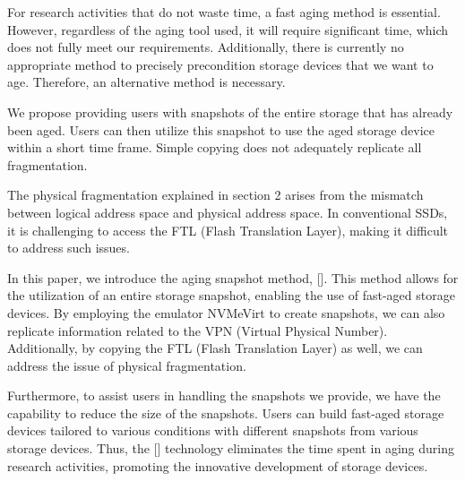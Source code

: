 For research activities that do not waste time, a fast aging method is essential.
However, regardless of the aging tool used, it will require significant time, which does not fully meet our requirements.
Additionally, there is currently no appropriate method to precisely precondition storage devices that we want to age.
Therefore, an alternative method is necessary.

We propose providing users with snapshots of the entire storage that has already been aged.
Users can then utilize this snapshot to use the aged storage device within a short time frame.
Simple copying does not adequately replicate all fragmentation.

The physical fragmentation explained in section 2 arises from the mismatch between logical address space and physical address space.
In conventional SSDs, it is challenging to access the FTL (Flash Translation Layer), making it difficult to address such issues.

In this paper, we introduce the aging snapshot method, [].
This method allows for the utilization of an entire storage snapshot, enabling the use of fast-aged storage devices.
By employing the emulator NVMeVirt to create snapshots, we can also replicate information related to the VPN (Virtual Physical Number).
Additionally, by copying the FTL (Flash Translation Layer) as well, we can address the issue of physical fragmentation.

Furthermore, to assist users in handling the snapshots we provide, we have the capability to reduce the size of the snapshots.
Users can build fast-aged storage devices tailored to various conditions with different snapshots from various storage devices.
Thus, the [] technology eliminates the time spent in aging during research activities, promoting the innovative development of storage devices.




